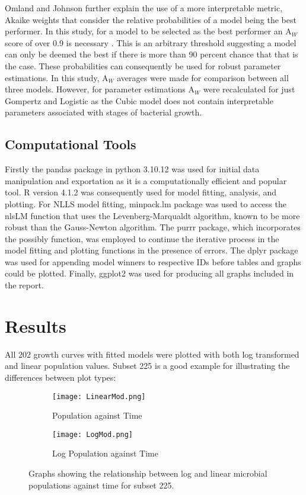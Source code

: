 \documentclass[11pt]{article}
\begin{document}
Omland and Johnson further explain the use of a more interpretable metric, Akaike weights that consider the relative probabilities of a model being the best performer. In this study, for a model to be selected as the best performer an $\mathrm{A}_{\textit{W}}$ score of over 0.9 is necessary \cite{DASH2023103140}. This is an arbitrary threshold suggesting a model can only be deemed the best if there is more than 90 percent chance that that is the case. These probabilities can consequently be used for robust parameter estimations. In this study, $\mathrm{A}_{\textit{W}}$ averages were made for comparison between all three models. However, for parameter estimations $\mathrm{A}_{\textit{W}}$ were recalculated for just Gompertz and Logistic as the Cubic model does not contain interpretable parameters associated with stages of bacterial growth.

\subsection{Computational Tools}

Firstly the pandas package in python 3.10.12 \cite{10.5555/1593511} was used for initial data manipulation and exportation as it is a computationally efficient and popular tool. R version 4.1.2 \cite{R} was consequently used for model fitting,  analysis, and plotting. For NLLS model fitting, minpack.lm package was used to access the nlsLM function that uses the Levenberg-Marqualdt algorithm, known to be more robust than the Gauss-Newton algorithm. The purrr package, which incorporates the possibly function, was employed to continue the iterative process in the model fitting and plotting functions in the presence of errors. The dplyr package was used for appending model winners to respective IDs before tables and graphs could be plotted. Finally, ggplot2 was used for producing all graphs included in the report.

\section{Results}
All 202 growth curves with fitted models were plotted with both log transformed and linear population values. Subset 225 is a good example for illustrating the differences between plot types:

\begin{figure}[htbp]
    \centering
    \begin{subfigure}{0.5\textwidth}
      \texttt{[image: LinearMod.png]}
      \caption{Population against Time}
    \end{subfigure}%
    \begin{subfigure}{0.5\textwidth}
      \texttt{[image: LogMod.png]}
      \caption{Log Population against Time}
    \end{subfigure}
    \caption{Graphs showing the relationship between log and linear microbial populations against time for subset 225.}
\end{figure}
\end{document}
